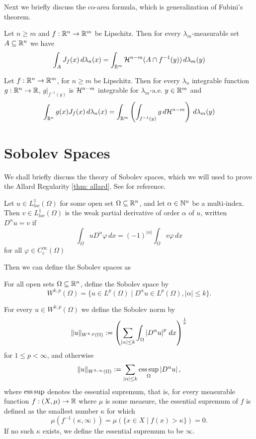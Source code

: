 Next we briefly discuss the co-area formula, which is generalization of Fubini's theorem.

\begin{theorem}
Let $n \ge m$ and $f:\mathbb{R}^n \to \mathbb{R}^m$ be Lipschitz. Then for every $\lambda_m$-measurable set $A \subseteq \mathbb{R}^n$ we have
\begin{align*}
    \int_A J_f(x) \, d\lambda_n(x) = \int_{\mathbb{R}^m} \mathcal{H}^{n-m}(A \cap f^{-1}(y)) \, d\lambda_m(y)
\end{align*}
\end{theorem}

\begin{theorem}
Let $f: \mathbb{R}^n \to \mathbb{R}^m$, for $n \ge m$ be Lipschitz. Then for every $\lambda_n$ integrable function $g:\mathbb{R}^n \to \mathbb{R}$, $g|_{f^{-1}(y)}$ is $\mathcal{H}^{n-m}$ integrable for $\lambda_m$-a.e. $y \in \mathbb{R}^m$ and
\begin{align*}
    \int_{\mathbb{R}^n} g(x)J_f(x)\, d\lambda_n(x) = \int_{\mathbb{R}^m} \left( \int_{ f^{-1}(y) } g\, d\mathcal{H}^{n-m} \right) \, d\lambda_m(y)
\end{align*}
\end{theorem}

\section{Sobolev Spaces}
We shall briefly discuss the theory of Sobolev spaces, which we will used to prove the Allard Regularity \cref{thm: allard}. See \cite{kinnunen20} for reference.

\begin{definition}
Let $u \in L_{loc}^1(\Omega)$ for some open set $\Omega \subseteq \mathbb{R}^n$, and let $\alpha \in \mathbb{N}^n$ be a multi-index. Then $v \in L_{loc}^1(\Omega)$ is the weak partial derivative of order $\alpha$ of $u$, written $D^{\alpha}u=v$ if
\[
    \int_{\Omega} u D^{\alpha}\varphi\, dx = (-1)^{|\alpha|} \int_{\Omega} v\varphi\, dx
\]
for all $\varphi \in C_c^{\infty}(\Omega)$
\end{definition}

Then we can define the Sobolev spaces as
\begin{definition}
For all open sets $\Omega \subseteq \mathbb{R}^n$, define the Sobolev space by
\[
    W^{k,p}(\Omega) = \{ u \in L^p(\Omega) \mid D^{\alpha} u \in L^p(\Omega), |\alpha| \le k \}.
\]
\end{definition}

For every $u \in W^{k,p}(\Omega)$ we define the Sobolev norm by
\[
    \Vert u \Vert_{W^{k,p}(\Omega)} := \left( \sum_{|\alpha| \le k} \int_{\Omega} \left| D^{\alpha}u \right|^p\, dx \right)^{\frac{1}{p}}
\]
for $1\le p < \infty$, and otherwise
\[
    \Vert u \Vert_{W^{k,\infty}(\Omega)} := \sum_{|\alpha| \le k} \operatorname*{ess\,sup}_{\Omega} \left| D^{\alpha}u \right|,
\]
where $\operatorname*{ess\,sup}$ denotes the essential supremum, that is, for every measurable function $f:(X,\mu) \to \mathbb{R}$ where $\mu$ is some measure, the essential supremum of $f$ is defined as the smallest number $\kappa$ for which
\[
    \mu(f^{-1}(\kappa, \infty)) = \mu(\{x \in X \mid f(x) > \kappa\}) = 0.
\]
If no such $\kappa$ exists, we define the essential supremum to be $\infty$.

